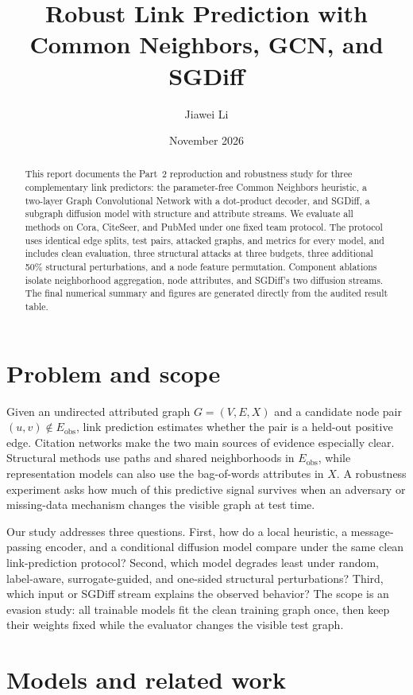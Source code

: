 \documentclass[11pt]{article}
\title{Robust Link Prediction with Common Neighbors, GCN, and SGDiff}
\author{Jiawei Li}
\date{November 2026}
\begin{document}
\maketitle

\begin{abstract}
This report documents the Part~2 reproduction and robustness study for three
complementary link predictors: the parameter-free Common Neighbors heuristic,
a two-layer Graph Convolutional Network with a dot-product decoder, and SGDiff,
a subgraph diffusion model with structure and attribute streams. We evaluate
all methods on Cora, CiteSeer, and PubMed under one fixed team protocol. The
protocol uses identical edge splits, test pairs, attacked graphs, and metrics
for every model, and includes clean evaluation, three structural attacks at
three budgets, three additional 50\% structural perturbations, and a node
feature permutation. Component ablations isolate neighborhood aggregation,
node attributes, and SGDiff's two diffusion streams. The final numerical
summary and figures are generated directly from the audited result table.
\end{abstract}

\section{Problem and scope}
Given an undirected attributed graph $G=(V,E,X)$ and a candidate node pair
$(u,v)\notin E_{\mathrm{obs}}$, link prediction estimates whether the pair is a
held-out positive edge. Citation networks make the two main sources of
evidence especially clear. Structural methods use paths and shared
neighborhoods in $E_{\mathrm{obs}}$, while representation models can also use
the bag-of-words attributes in $X$. A robustness experiment asks how much of
this predictive signal survives when an adversary or missing-data mechanism
changes the visible graph at test time.

Our study addresses three questions. First, how do a local heuristic, a
message-passing encoder, and a conditional diffusion model compare under the
same clean link-prediction protocol? Second, which model degrades least under
random, label-aware, surrogate-guided, and one-sided structural perturbations?
Third, which input or SGDiff stream explains the observed behavior? The scope
is an evasion study: all trainable models fit the clean training graph once,
then keep their weights fixed while the evaluator changes the visible test
graph.

\section{Models and related work}
\end{document}
